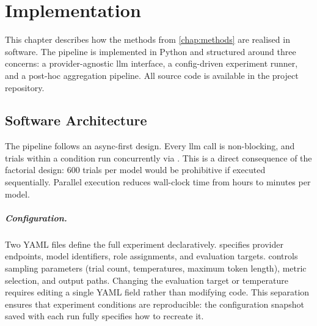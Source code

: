 \chapter{Implementation}
\label{chap:implementation}


This chapter describes how the methods from \autoref{chap:methods} are
realised in software. The pipeline is implemented in Python and structured
around three concerns: a provider-agnostic \gls{llm} interface, a
config-driven experiment runner, and a post-hoc aggregation pipeline. All
source code is available in the project repository.


\section{Software Architecture}
\label{sec:impl-architecture}

The pipeline follows an async-first design. Every \gls{llm} call is
non-blocking, and trials within a condition run concurrently via
. This is a direct consequence of the factorial
design: 600 trials per model would be prohibitive if executed sequentially.
Parallel execution reduces wall-clock time from hours to minutes per model.

\paragraph{Configuration.}
Two YAML files define the full experiment declaratively.
 specifies provider endpoints, model identifiers, role
assignments, and evaluation targets.  controls
sampling parameters (trial count, temperatures, maximum token length),
metric selection, and output paths. Changing the evaluation target or
temperature requires editing a single YAML field rather than modifying
code. This separation ensures that experiment conditions are reproducible:
the configuration snapshot saved with each run fully specifies how to
recreate it.

